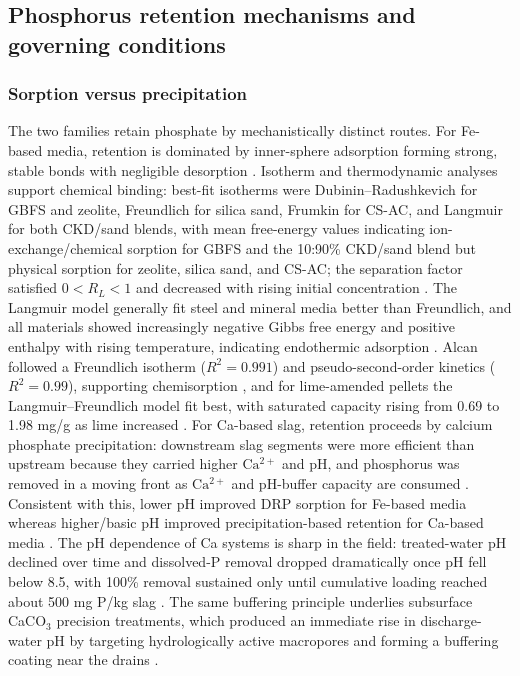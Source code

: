 \subsection{Phosphorus retention mechanisms and governing conditions}

\subsubsection{Sorption versus precipitation}

The two families retain phosphate by mechanistically distinct routes. For Fe-based media, retention is dominated by inner-sphere adsorption forming strong, stable bonds with negligible desorption \parencite{Mendes2022}. Isotherm and thermodynamic analyses support chemical binding: best-fit isotherms were Dubinin--Radushkevich for GBFS and zeolite, Freundlich for silica sand, Frumkin for CS-AC, and Langmuir for both CKD/sand blends, with mean free-energy values indicating ion-exchange/chemical sorption for GBFS and the 10:90\% CKD/sand blend but physical sorption for zeolite, silica sand, and CS-AC; the separation factor satisfied $0 < R_L < 1$ and decreased with rising initial concentration \parencite{Agrawal2011}. The Langmuir model generally fit steel and mineral media better than Freundlich, and all materials showed increasingly negative Gibbs free energy and positive enthalpy with rising temperature, indicating endothermic adsorption \parencite{Sellner2019b}. Alcan followed a Freundlich isotherm ($R^2=0.991$) and pseudo-second-order kinetics ($R^2=0.99$), supporting chemisorption \parencite{Kumari2025}, and for lime-amended pellets the Langmuir--Freundlich model fit best, with saturated capacity rising from 0.69 to 1.98 mg/g as lime increased \parencite{Li2017}. For Ca-based slag, retention proceeds by calcium phosphate precipitation: downstream slag segments were more efficient than upstream because they carried higher $\mathrm{Ca^{2+}}$ and pH, and phosphorus was removed in a moving front as $\mathrm{Ca^{2+}}$ and pH-buffer capacity are consumed \parencite{Wang2020d}. Consistent with this, lower pH improved DRP sorption for Fe-based media whereas higher/basic pH improved precipitation-based retention for Ca-based media \parencite{Mendes2022}. The pH dependence of Ca systems is sharp in the field: treated-water pH declined over time and dissolved-P removal dropped dramatically once pH fell below 8.5, with 100\% removal sustained only until cumulative loading reached about 500 mg P/kg slag \parencite{Penn2020}. The same buffering principle underlies subsurface CaCO$_3$ precision treatments, which produced an immediate rise in discharge-water pH by targeting hydrologically active macropores and forming a buffering coating near the drains \parencite{Dalhem2019}.

